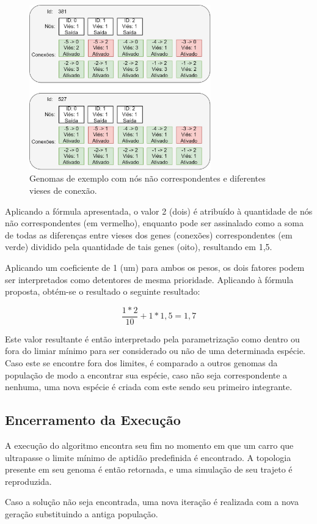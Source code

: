 \begin{figure}[htb]
        \centering
        \caption{\label{fig_NA}Genomas de exemplo com nós não correspondentes e diferentes vieses de conexão.}
        \includegraphics[width=0.7\textwidth]{images/NA.png}
\end{figure}

Aplicando a fórmula apresentada, o valor 2 (dois) é atribuído à quantidade de nós não correspondentes (em vermelho), enquanto \textit{} pode ser assinalado como a soma de todas as diferenças entre vieses dos genes (conexões) correspondentes (em verde) dividido pela quantidade de tais genes (oito), resultando em 1,5.

Aplicando um coeficiente de 1 (um) para ambos os pesos, os dois fatores podem ser interpretados como detentores de mesma prioridade. Aplicando à fórmula proposta, obtém-se o resultado o seguinte resultado:

\[ \frac{1 * 2}{10} + 1 * 1,5 = 1,7\]

Este valor resultante é então interpretado pela parametrização como dentro ou fora do limiar mínimo para ser considerado ou não de uma determinada espécie. Caso este se encontre fora dos limites, é comparado a outros genomas da população de modo a encontrar sua espécie, caso não seja correspondente a nenhuma, uma nova espécie é criada com este sendo seu primeiro integrante.

\subsection{Encerramento da Execução}
A execução do algoritmo encontra seu fim no momento em que um carro que ultrapasse o limite mínimo de aptidão predefinida é encontrado. A topologia presente em seu genoma é então retornada, e uma simulação de seu trajeto é reproduzida.

Caso a solução não seja encontrada, uma nova iteração é realizada com a nova geração substituindo a antiga população.
